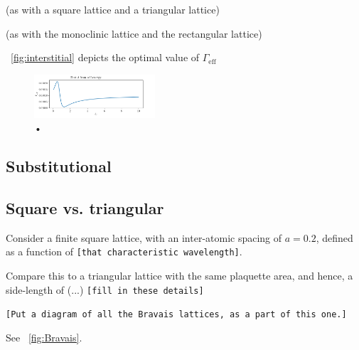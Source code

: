 \documentclass[aps,pra,superscriptaddress,twocolumn]{revtex4-1}
\newcommand{\fref}[1]{\text{Fig.}~\ref{#1}}
\newcommand{\commentSB}[1]{\texttt{\color{blue}[#1]}}
\newcommand{\commentTP}[1]{\texttt{\color{green}[#1]}}
\begin{document}
(as with a square lattice and a triangular lattice)

(as with the monoclinic lattice and the rectangular lattice)

\fref{fig:interstitial} depicts the optimal value of $\Gamma_\text{eff}$


\begin{figure}
    \centering
    \includegraphics[width=0.4\textwidth]{figures/temp_delta_check_cropped.png} 
    \caption{•}
    \label{fig:delta_check}
\end{figure}







\subsection{Substitutional}


\subsection{Square vs. triangular}

Consider a finite square lattice, with an inter-atomic spacing of $a = 0.2$, defined as a function of \commentSB{that characteristic wavelength}. 

Compare this to a triangular lattice with the same plaquette area, and hence, a side-length of (...) 
\commentSB{fill in these details}


\commentSB{Put a diagram of all the Bravais lattices, as a part of this one.}

See \fref{fig:Bravais}.

\end{document}
